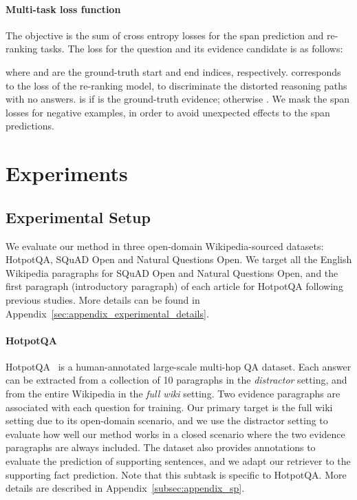 \documentclass{article} \usepackage{iclr2020_conference,times}
\begin{document}
\vspace{-2mm}\paragraph{Multi-task loss function}
The objective is the sum of cross entropy losses for the span prediction and re-ranking tasks.
The loss for the question  and its evidence candidate  is as follows:

where  and  are the ground-truth start and end indices, respectively.
 corresponds to the loss of the re-ranking model, to discriminate the distorted reasoning paths with no answers.
 is  if  is the ground-truth evidence; otherwise .
We mask the span losses for negative examples, in order to avoid unexpected effects to the span predictions.




\section{Experiments}
\subsection{Experimental Setup}
We evaluate our method in three open-domain Wikipedia-sourced datasets: HotpotQA, SQuAD Open and Natural Questions Open.
We target all the English Wikipedia paragraphs for SQuAD Open and Natural Questions Open, and the first paragraph (introductory paragraph) of each article for HotpotQA following previous studies.
More details can be found in Appendix~\ref{sec:appendix_experimental_details}.

\vspace{-2mm}\paragraph{HotpotQA}
HotpotQA~\citep{yang-etal-2018-hotpotqa} is a human-annotated large-scale multi-hop QA dataset.
Each answer can be extracted from a collection of 10 paragraphs in the {\it distractor} setting, and from the entire Wikipedia in the {\it full wiki} setting.
Two evidence paragraphs are associated with each question for training.
Our primary target is the full wiki setting due to its open-domain scenario, and we use the distractor setting to evaluate how well our method works in a closed scenario where the two evidence paragraphs are always included.
The dataset also provides annotations to evaluate the prediction of supporting sentences, and we adapt our retriever to the supporting fact prediction.
Note that this subtask is specific to HotpotQA.
More details are described in Appendix~\ref{subsec:appendix_sp}.
\end{document}
